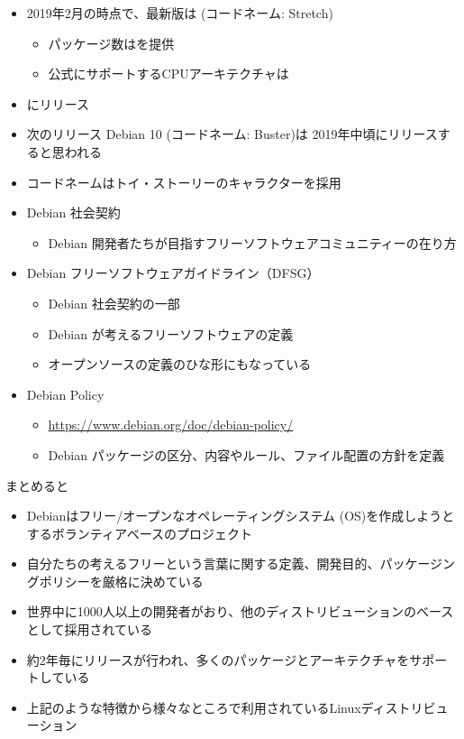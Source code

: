 \documentclass[mingoth,a4paper]{jsarticle}
\begin{document}
\begin{itemize}
  \item 2019年2月の時点で、最新版は {\color{red}{Debian 9.8}} (コードネーム: Stretch)
  \begin{itemize}
    \item パッケージ数は{\color{red}{約51000}}を提供
    \item 公式にサポートするCPUアーキテクチャは{\color{red}{10}}
  \end{itemize}
  \item {\color{red}{約2年毎}}にリリース
  \item 次のリリース Debian 10 (コードネーム: {\color{red}{}}Buster)は 2019年中頃にリリースすると思われる
  \item コードネームはトイ・ストーリーのキャラクターを採用
\end{itemize}




\begin{itemize}
  \item Debian 社会契約
    \begin{itemize}
      \item Debian 開発者たちが目指すフリーソフトウェアコミュニティーの在り方
    \end{itemize}
  \item Debian フリーソフトウェアガイドライン（DFSG）
    \begin{itemize}
      \item Debian 社会契約の一部
      \item Debian が考えるフリーソフトウェアの定義
      \item オープンソースの定義のひな形にもなっている
    \end{itemize}
  \item Debian Policy
    \begin{itemize}
      \item \url{https://www.debian.org/doc/debian-policy/}
      \item Debian パッケージの区分、内容やルール、ファイル配置の方針を定義
    \end{itemize}
\end{itemize}




まとめると
\begin{itemize}
  \item Debianはフリー/オープンなオペレーティングシステム (OS)を作成しようとするボランティアベースのプロジェクト
  \item 自分たちの考えるフリーという言葉に関する定義、開発目的、パッケージングポリシーを厳格に決めている
  \item 世界中に1000人以上の開発者がおり、他のディストリビューションのベースとして採用されている
  \item 約2年毎にリリースが行われ、多くのパッケージとアーキテクチャをサポートしている
  \item 上記のような特徴から様々なところで利用されているLinuxディストリビューション
\end{itemize}
\end{document}
